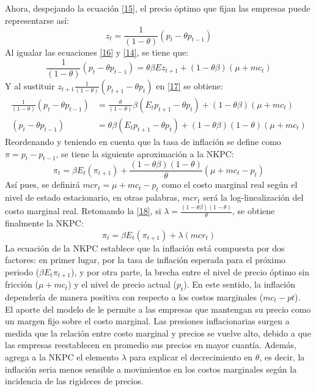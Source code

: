 Ahora, despejando la ecuación \eqref{15}, el precio óptimo que fijan las empresas puede representarse así:
\begin{equation}\label{16}
z_{t}=\frac{1}{(1-\theta)}(p_{t}-\theta p_{t-1})
\end{equation}
Al igualar las ecuaciones \eqref{16} y \eqref{14}, se tiene que: 
\begin{equation}\label{17}
\frac{1}{(1-\theta)}(p_{t}-\theta p_{t-1})=\theta\beta Ez_{t+1}+(1-\theta\beta)(\mu +mc_{t}) 
\end{equation}
Y al sustituir $z_{t+1}\frac{1}{(1-\theta)}(p_{t+1}-\theta p_{t})$ en \eqref{17} se obtiene:
\begin{align}
\frac{1}{(1-\theta)}(p_{t}-\theta p_{t-1})&=\frac{\theta}{(1-\theta)}\beta (E_{t}p_{t+1}-\theta p_{t})+(1-\theta\beta)(\mu +mc_{t}) \\
(p_{t}-\theta p_{t-1})&=\theta\beta (E_{t}p_{t+1}-\theta p_{t})+(1-\theta\beta)(1-\theta)(\mu +mc_{t}) 
\end{align}
Reordenando y teniendo en cuenta que la tasa de inflación se define como $\pi =p_{t}-p_{t-1}$, se tiene la siguiente aproximación a la NKPC:
\begin{equation}\label{18}
\pi_{t}=\beta E_{t}(\pi_{t+1})+\frac{(1-\theta\beta)(1-\theta)}{\theta}(\mu +mc_{t}-p_{t})
\end{equation}
Así pues, se definirá $mcr_{t}=\mu +mc_{t}-p_{t}$ como el costo marginal real según el nivel de estado estacionario, en otras palabras, $mcr_{t}$ será la log-linealización del costo marginal real. Retomando  la \eqref{18}, si $\lambda =\frac{(1-\theta\beta)(1-\theta)}{\theta} $, se obtiene finalmente la NKPC: 
\begin{equation}\label{19}
\pi_{t}=\beta E_{t}(\pi_{t+1})+\lambda(mcr_{t})
\end{equation}
La ecuación de la NKPC establece que la inflación está compuesta por dos factores: en primer lugar, por la tasa de inflación esperada para el próximo periodo ($\beta E_{t}\pi_{t+1}$), y por otra parte,  la brecha entre el nivel de precio óptimo sin fricción ($\mu +mc_{t}$) y el nivel de precio actual ($p_{t}$). En este sentido, la inflación dependería de manera positiva con respecto a los costos marginales ($mc_{t} - p{t}$).\\

El aporte del modelo de \cite{calvo1983staggered} le permite a las empresas que mantengan su precio como un margen fijo sobre el costo marginal. Las presiones inflacionarias surgen a medida que la relación entre costo marginal y precios se vuelve alto, debido a que las empresas reestablecen en promedio sus precios en mayor cuantía. Además, \cite{gali1999inflation} agrega a la NKPC  el elemento $\lambda$ para explicar el decrecimiento en  $\theta$, es decir, la inflación seria menos sensible a movimientos en los costos marginales según la incidencia de las rigideces de precios.\\

